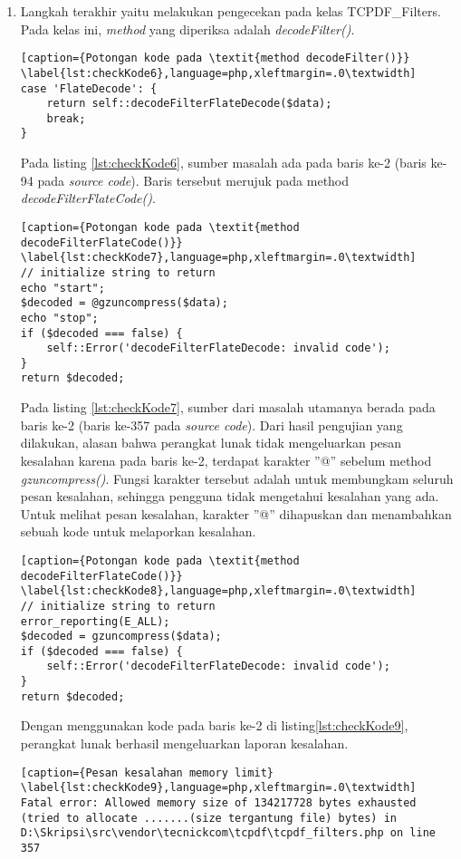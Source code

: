\begin{enumerate}
	\item Langkah terakhir yaitu melakukan pengecekan pada kelas TCPDF\_Filters. Pada kelas ini, \textit{method} yang diperiksa adalah \textit{decodeFilter()}.
	
\begin{lstlisting}[caption={Potongan kode pada \textit{method decodeFilter()}}	\label{lst:checkKode6},language=php,xleftmargin=.0\textwidth]
case 'FlateDecode': {
	return self::decodeFilterFlateDecode($data);
	break;
}
\end{lstlisting}
	
	Pada listing \ref{lst:checkKode6}, sumber masalah ada pada baris ke-2 (baris ke-94 pada \textit{source code}). Baris tersebut merujuk pada method \textit{decodeFilterFlateCode()}.
	
\begin{lstlisting}[caption={Potongan kode pada \textit{method decodeFilterFlateCode()}}	\label{lst:checkKode7},language=php,xleftmargin=.0\textwidth]
// initialize string to return
echo "start";
$decoded = @gzuncompress($data);
echo "stop";
if ($decoded === false) {
	self::Error('decodeFilterFlateDecode: invalid code');
}
return $decoded;
\end{lstlisting}

	Pada listing \ref{lst:checkKode7}, sumber dari masalah utamanya berada pada baris ke-2 (baris ke-357 pada \textit{source code}). Dari hasil pengujian yang dilakukan, alasan bahwa perangkat lunak tidak mengeluarkan pesan kesalahan karena pada baris ke-2, terdapat karakter ''@'' sebelum method \textit{gzuncompress()}. Fungsi karakter tersebut adalah untuk membungkam seluruh pesan kesalahan, sehingga pengguna tidak mengetahui kesalahan yang ada. Untuk melihat pesan kesalahan, karakter ''@'' dihapuskan dan menambahkan sebuah kode untuk melaporkan kesalahan.
	
\begin{lstlisting}[caption={Potongan kode pada \textit{method decodeFilterFlateCode()}}	\label{lst:checkKode8},language=php,xleftmargin=.0\textwidth]
// initialize string to return
error_reporting(E_ALL);
$decoded = gzuncompress($data);
if ($decoded === false) {
	self::Error('decodeFilterFlateDecode: invalid code');
}
return $decoded;
\end{lstlisting}

	Dengan menggunakan kode pada baris ke-2 di listing\ref{lst:checkKode9}, perangkat lunak berhasil mengeluarkan laporan kesalahan.
	
\begin{lstlisting}[caption={Pesan kesalahan memory limit}	\label{lst:checkKode9},language=php,xleftmargin=.0\textwidth]
Fatal error: Allowed memory size of 134217728 bytes exhausted (tried to allocate .......(size tergantung file) bytes) in D:\Skripsi\src\vendor\tecnickcom\tcpdf\tcpdf_filters.php on line 357
\end{lstlisting}
	

\end{enumerate}
